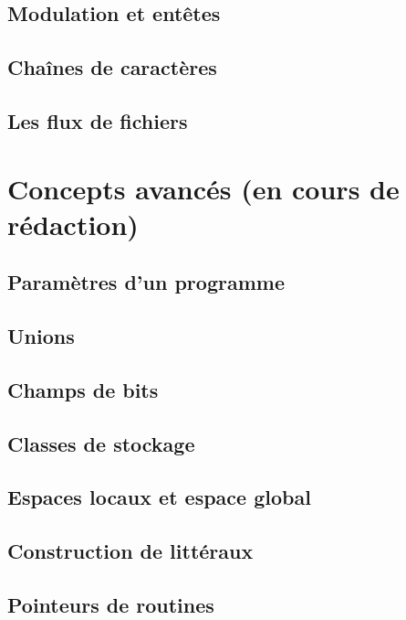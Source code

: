 \documentclass{minitelreport}
\begin{document}
\begin{refsection}
		\section{Modulation et entêtes}
		
		\section{Chaînes de caractères}
		
		\section{Les flux de fichiers}
		
	\chapter{Concepts avancés (en cours de rédaction)}
		\section{Paramètres d'un programme}
		
		\section{Unions}
		
		\section{Champs de bits}
		
		\section{Classes de stockage}
		
		\section{Espaces locaux et espace global}
		
		\section{Construction de littéraux}
		
		\section{Pointeurs de routines}
		

\end{refsection}
\end{document}
